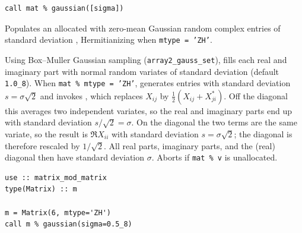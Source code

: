 
\lstset{language=[95]Fortran}
\begin{lstlisting}
call mat % gaussian([sigma])
\end{lstlisting}

Populates an allocated  with zero-mean Gaussian random complex entries of standard deviation , Hermitianizing when \texttt{mtype = 'ZH'}.

Using Box--Muller Gaussian sampling (\texttt{array2\_gauss\_set}),  fills each real and imaginary part with normal random variates of standard deviation  (default \texttt{1.0\_8}). When \texttt{mat \% mtype = 'ZH'},  generates entries with standard deviation $s = \sigma \sqrt{2}$ and invokes , which replaces $X_{ij}$ by $\frac{1}{2}(X_{ij} + X_{ji}^*)$. Off the diagonal this averages two independent variates, so the real and imaginary parts end up with standard deviation $s/\sqrt{2} = \sigma$. On the diagonal the two terms are the same variate, so the result is $\Re X_{ii}$ with standard deviation $s = \sigma\sqrt{2}$; the diagonal is therefore rescaled by $1/\sqrt{2}$. All real parts, imaginary parts, and the (real) diagonal then have standard deviation $\sigma$. Aborts if \texttt{mat \% v} is unallocated.

\begin{description}[leftmargin=2.2cm, style=nextline]
\end{description}

\lstset{language=[95]Fortran}
\begin{lstlisting}
use :: matrix_mod_matrix
type(Matrix) :: m

m = Matrix(6, mtype='ZH')
call m % gaussian(sigma=0.5_8)
\end{lstlisting}


